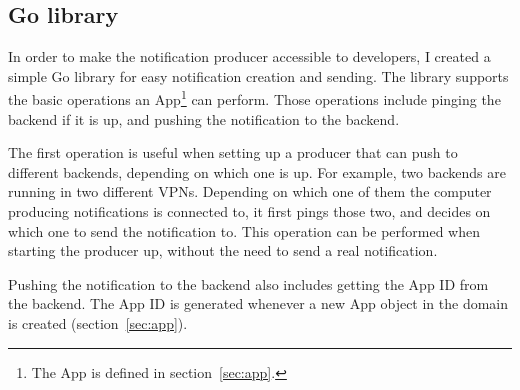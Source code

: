 \subsection{Go library}\label{sec:producer-go-library}

In order to make the notification producer
accessible to developers,
I created a simple Go library
for easy notification creation and sending.
The library supports the basic operations
an App\footnote{
  The App is defined in section~\ref{sec:app}.
} can perform.
Those operations include pinging the backend if it is up,
and pushing the notification to the backend.

The first operation is useful when setting up
a producer that can push to different backends,
depending on which one is up.
For example,
two backends are running
in two different VPNs.
Depending on which one of them
the computer producing notifications
is connected to,
it first pings those two,
and decides on which one to send the notification to.
This operation can be performed
when starting the producer up,
without the need to send a real notification.

Pushing the notification to the backend
also includes getting the App ID from the backend.
The App ID is generated whenever
a new App object in the domain is created
(section~\ref{sec:app}).
